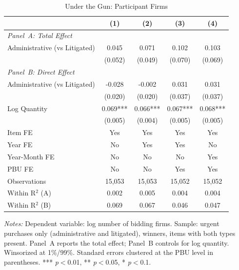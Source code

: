 \begin{table}[ht]
  \centering
  \caption{Under the Gun: Participant Firms}
  \label{tab:t1_utg_firms}
  \small
  \begin{threeparttable}
  \begin{tabular}{lcccc}
    \hline\hline
    & (1) & (2) & (3) & (4) \\
    \hline
    \multicolumn{5}{l}{\textit{Panel~A: Total Effect}} \\[3pt]
    Administrative (vs Litigated) & 0.045 & 0.071 & 0.102 & 0.103 \\
     & (0.052) & (0.049) & (0.070) & (0.069) \\[3pt]
    \hline
    \multicolumn{5}{l}{\textit{Panel~B: Direct Effect}} \\[3pt]
    Administrative (vs Litigated) & -0.028 & -0.002 & 0.031 & 0.031 \\
     & (0.020) & (0.020) & (0.037) & (0.037) \\[3pt]
    Log Quantity & 0.069*** & 0.066*** & 0.067*** & 0.068*** \\
     & (0.005) & (0.004) & (0.005) & (0.005) \\[3pt]
    \hline
    Item FE & Yes & Yes & Yes & Yes \\
    Year FE & No & Yes & Yes & No \\
    Year-Month FE & No & No & No & Yes \\
    PBU FE & No & No & Yes & Yes \\
    Observations & 15,053 & 15,053 & 15,052 & 15,052 \\
    Within R$^2$ (A) & 0.002 & 0.005 & 0.004 & 0.004 \\
    Within R$^2$ (B) & 0.069 & 0.067 & 0.046 & 0.047 \\
    \hline\hline
  \end{tabular}
  \begin{tablenotes}
    \small
    \item \textit{Notes:} Dependent variable: log number of bidding firms. Sample: urgent purchases only (administrative and litigated), winners, items with both types present. Panel~A reports the total effect; Panel~B controls for log quantity. Winsorized at 1\%/99\%. Standard errors clustered at the PBU level in parentheses. *** \textit{p}$<$0.01, ** \textit{p}$<$0.05, * \textit{p}$<$0.1.
  \end{tablenotes}
  \end{threeparttable}
\end{table}
